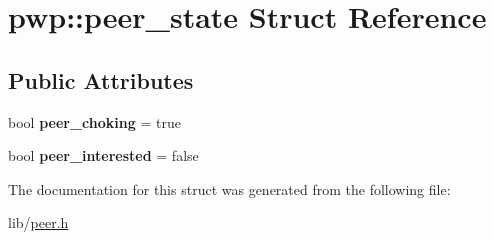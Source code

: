\hypertarget{structpwp_1_1peer__state}{}\section{pwp\+:\+:peer\+\_\+state Struct Reference}
\label{structpwp_1_1peer__state}
\subsection*{Public Attributes}
\begin{DoxyCompactItemize}
\item 
\mbox{\label{structpwp_1_1peer__state_ab98eeb7525aa57db451b4b7446f47ba3}} 
bool {\bfseries peer\+\_\+choking} = true
\item 
\mbox{\label{structpwp_1_1peer__state_a3d6e90c271ea2c48b3dbada7371e4757}} 
bool {\bfseries peer\+\_\+interested} = false
\end{DoxyCompactItemize}


The documentation for this struct was generated from the following file\+:\begin{DoxyCompactItemize}
\item 
lib/\hyperlink{peer_8h}{peer.\+h}\end{DoxyCompactItemize}
